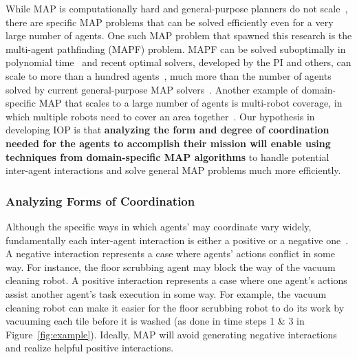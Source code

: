 \documentclass[11pt]{article}
\begin{document}
While MAP is computationally hard and general-purpose planners do not scale~\cite{bernstein2002complexity,witwicki2011towards,brafman2013complexity}, there are specific MAP problems that can be solved efficiently even for a very large number of agents. One such MAP problem that spawned this research is the multi-agent pathfinding (MAPF) problem. MAPF can be solved suboptimally in polynomial time~\cite{wang2009tractable,de2013push,roger2012non} and recent optimal solvers, developed by the PI and others, can scale to more than a hundred agents~\cite{sharon2015conflict-based,sharon2013increasing,wagner2015subdimensional,boyarski2015don,boyarski2015icbs,barer2014suboptimal-socs,CohenUK15}, much more than the number of agents solved by current general-purpose MAP solvers~\cite{dibangoye2014exploiting,maliah2014privacyPreserving}. Another example of domain-specific MAP that scales to a large number of agents is multi-robot coverage, in which multiple robots need to cover an area together~\cite{agmon2008giving}. 
Our hypothesis in developing IOP is that {\bf analyzing the form and degree of coordination needed for the agents to accomplish their mission will enable using techniques from domain-specific MAP algorithms} to handle potential inter-agent interactions and solve general MAP problems much more efficiently. %

\subsubsection{Analyzing Forms of Coordination}
Although the specific ways in which agents' may coordinate vary widely, fundamentally each inter-agent interaction is either a positive or a negative one~\cite{cox2009efficient}. A negative interaction represents a case where agents' actions conflict in some way. For instance, the floor scrubbing agent may block the way of the vacuum cleaning robot. A positive interaction represents a case where one agent's actions assist another agent's task execution in some way. For example, the vacuum cleaning robot can make it easier for the floor scrubbing robot to do its work by vacuuming each tile before it is washed (as done in time steps 1 \& 3 in Figure~\ref{fig:example}). Ideally, MAP will avoid generating negative interactions and realize helpful positive interactions. 
\end{document}

